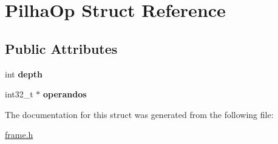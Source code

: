 \hypertarget{structPilhaOp}{}\section{Pilha\+Op Struct Reference}
\label{structPilhaOp}
\subsection*{Public Attributes}
\begin{DoxyCompactItemize}
\item 
\mbox{\label{structPilhaOp_ad3fdbfc30e2a1b62169ce905a3af6a39}} 
int {\bfseries depth}
\item 
\mbox{\label{structPilhaOp_a66868e47a39d4f335823ae7de24947bf}} 
int32\+\_\+t $\ast$ {\bfseries operandos}
\end{DoxyCompactItemize}


The documentation for this struct was generated from the following file\+:\begin{DoxyCompactItemize}
\item 
\mbox{\hyperlink{frame_8h}{frame.\+h}}\end{DoxyCompactItemize}
